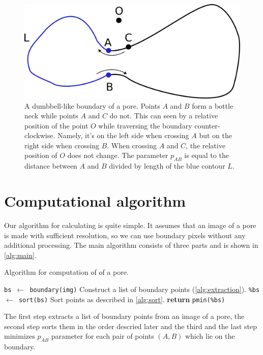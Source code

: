 \documentclass[reprint,amsmath,amssymb,aps,pre,showkeys,showpacs]{revtex4-1}
\newcommand{\highlight}[1]{{\color{red}{#1}}} %
\begin{document}
\begin{figure}
  \centering
  \includegraphics[width=0.9\linewidth]{images/parameter.png}
  \caption[]{A dumbbell-like boundary of a pore. Points $A$ and $B$ form a
    bottle neck while points $A$ and $C$ do not. This can seen by a relative
    position of the point $O$ while traversing the boundary
    counter-clockwise. Namely, it's on the left side when crossing $A$ but on
    the right side when crossing $B$. When crossing $A$ and $C$, the relative
    position of $O$ does not change. The parameter $p_{AB}$ is equal to the
    distance between $A$ and $B$ divided by length of the blue contour $L$.}
  \label{fig:parameter}
\end{figure}

\section{Computational algorithm}
\label{seq:alg}
Our algorithm for calculating \highlight{awesomeness} is quite simple. It
assumes that an image of a pore is made with sufficient resolution, so we can
use boundary pixels without any additional processing. The main algorithm
consists of three parts and is shown in \cref{alg:main}.
\begin{algorithm}[H]
  \caption{Algorithm for computation of \highlight{awesomeness} of a pore.}
  \label{alg:main}
  \begin{algorithmic}[1]
    \State \texttt{bs $\gets$ boundary(img)}
    \Comment Construct a list of boundary points (\cref{alg:extraction}).
    \State \texttt{\%bs $\gets$ sort(bs)}
    \Comment Sort points as described in \cref{alg:sort}.
    \State \textbf{return} \texttt{pmin(\%bs)}
    \EndProcedure
  \end{algorithmic}
\end{algorithm}

The first step extracts a list of boundary points from an image of a pore, the
second step sorts them in the order descried later and the third and the last
step minimizes $p_{AB}$ parameter for each pair of points $(A, B)$ which lie on
the boundary.
\end{document}
